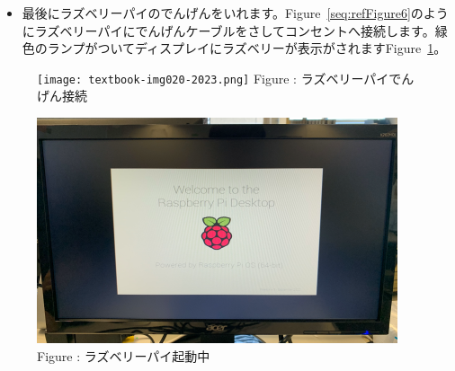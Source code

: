\documentclass[a4paper,12pt]{jarticle}
\begin{document}
\begin{enumerate}
        \begin{itemize}
          \item
                最後にラズベリーパイのでんげんをいれます。Figure~\ref{seq:refFigure6}のようにラズベリーパイにでんげんケーブルをさしてコンセントへ接続します。緑色のランプがついてディスプレイにラズベリーが表示がされますFigure~\ref{seq:refFigure7}。
        \end{itemize}
        \begin{figure}
          \centering
          \begin{minipage}{0.4\textwidth}
            {\upshape
              \texttt{[image: textbook-img020-2023.png]}
              \newline
              Figure {\theFigure\label{seq:refFigure6}}:
              ラズベリーパイでんげん接続}
          \end{minipage}
          \begin{minipage}{0.4\textwidth}
            {\upshape
              \includegraphics[width=.9\linewidth]{textbook-img0212023.png}
              \newline
              Figure {\theFigure\label{seq:refFigure7}}:
              ラズベリーパイ起動中}
            \end{minipage}
          \end{figure}
          
\clearpage        
\end{enumerate}
\end{document}
